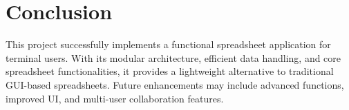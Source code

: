 \documentclass{article}
\begin{document}

\section{Conclusion}
This project successfully implements a functional spreadsheet application for terminal users. With its modular architecture, efficient data handling, and core spreadsheet functionalities, it provides a lightweight alternative to traditional GUI-based spreadsheets. Future enhancements may include advanced functions, improved UI, and multi-user collaboration features.
\end{document}
